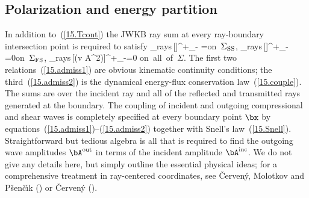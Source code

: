 \subsection{Polarization and energy partition}
%
%
%
%
\renewcommand{\thesubsection}{\arabic{chapter}.\arabic{section}.\arabic{subsection}}

In addition to~(\ref{15.Tcont}) the JWKB ray sum at every
ray-boundary intersection point is required to satisfy
\eq \label{15.admiss1}
\sum_{\rm rays}\,[\bA]^+_-
=\bzero\quad\mbox{on $\Sigma_{\rm SS}$,}
\qquad \sum_{\rm rays}\,[\bnh\cdot\bA]^+_-
=0\quad\mbox{on $\Sigma_{\rm FS}$,}
\en
\eq \label{15.admiss2}
\sum_{\rm rays}\,[\bnh\cdot(\rho v A^2\hat{\bp})]^+_-=0\quad
\mbox{on all of $\Sigma$.}
\en
The first two relations~(\ref{15.admiss1}) are obvious kinematic
continuity conditions; the third~(\ref{15.admiss2}) is the dynamical
energy-flux conservation law~(\ref{15.couple}).  The sums
are over the incident ray and all of the reflected and
transmitted rays generated at the boundary.  The coupling
of incident and outgoing compressional and shear waves is
completely specified at every boundary point $\bx$ by
equations~(\ref{15.admiss1})--(\ref{15.admiss2}) together
with Snell's law~(\ref{15.Snell}).  Straightforward but
tedious algebra is all that is required to find the outgoing
wave amplitudes $\bA^{\rm out}$ in terms of the incident
amplitude $\bA^{\rm inc}$.  We do not give any details
here, but simply outline the essential physical ideas; for a
comprehensive treatment in ray-centered coordinates, see 
\v{C}erven\'{y}, Molotkov and P\v{s}en\v{c}\'{\i}k
(\citeyear{cerveny&al77}) or \v{C}erven\'{y}
(\citeyear{cerveny85}).

